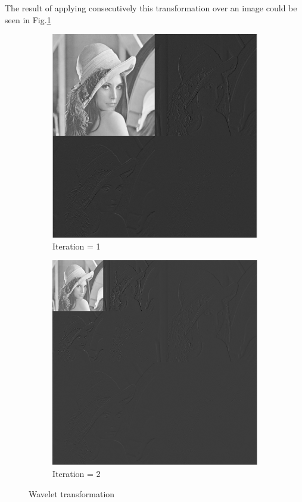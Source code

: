 \documentclass[a4paper, 10pt, conference] {article}
\begin{document}
 The result of applying consecutively this transformation over an image could be seen in Fig.\ref{Wavelet}
 \begin{figure}[H]
 	\centering
 	\begin{subfigure}{0.32\textwidth} 
 		\centering						
 		\includegraphics[scale=0.35]{reportImages/HaarW1.PNG}
 		\caption{Iteration = 1}
 	\end{subfigure}
 	\begin{subfigure}{0.32\textwidth}
 		\centering
 		\includegraphics[scale=0.35]{reportImages/HaarW2.PNG}
 		\caption{Iteration = 2}
 	\end{subfigure}
 	
 	\caption{Wavelet transformation }
 	\label{Wavelet}
 \end{figure}
\end{document}
